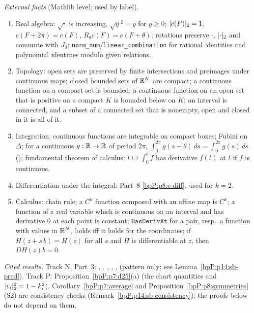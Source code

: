 \emph{External facts} (Mathlib level; used by label).
\begin{enumerate}[label=(X\arabic*),ref=(X\arabic*)]
\item\label{bpP:p14:sb-x-alg} Real algebra: $\sqrt{\cdot}$ is increasing, $\sqrt{y}^2=y$ for $y\ge0$; $\lvert c(F)\rvert_2=1$, $c(F+2\pi)=c(F)$, $R_\theta c(F)=c(F+\theta)$; rotations preserve $\cdot$, $\lvert \cdot\rvert_2$ and commute with $J_0$; \texttt{norm\_num}/\texttt{linear\_combination} for rational identities and polynomial identities modulo given relations.
\item\label{bpP:p14:sb-x-top} Topology: open sets are preserved by finite intersections and preimages under continuous maps; closed bounded sets of $\mathbb{R}^N$ are compact; a continuous function on a compact set is bounded; a continuous function on an open set that is positive on a compact $K$ is bounded below on $K$; an interval is connected, and a subset of a connected set that is nonempty, open and closed in it is all of it.
\item\label{bpP:p14:sb-x-int} Integration: continuous functions are integrable on compact boxes; Fubini on $\Delta$; for a continuous $g:\mathbb{R}\to\mathbb{R}$ of period $2\pi$, $\int_0^{2\pi}g(s-\theta)\,ds=\int_0^{2\pi}g(s)\,ds$ (); fundamental theorem of calculus: $t\mapsto\int_0^t f$ has derivative $f(t)$ at $t$ if $f$ is continuous.
\item\label{bpP:p14:sb-x-diff} Differentiation under the integral: Part~8 \ref{bpP:p8:e-diff}, used for $k=2$.
\item\label{bpP:p14:sb-x-calc} Calculus: chain rule; a $C^k$ function composed with an affine map is $C^k$; a function of a real variable which is continuous on an interval and has derivative $0$ at each point is constant; $\texttt{HasDerivAt}$ for a pair, resp.\ a function with values in $\mathbb{R}^N$, holds iff it holds for the coordinates; if $H(z+s\,b)=H(z)$ for all $s$ and $H$ is differentiable at $z$, then $DH(z)b=0$.
\end{enumerate}
\emph{Cited results.} Track N, Part~3: , , , , ,  (pattern only; see Lemma~\ref{bpP:p14:sb-pred}).
Track P: Proposition~\ref{bpP:p7:d25}(a) (the chart quantities and $\lvert v_i\rvert_2^2=1-k_i^2$), Corollary~\ref{bpP:p7:average} and Proposition~\ref{bpP:p8:symmetries}(S2) are consistency checks (Remark~\ref{bpP:p14:sb-consistency}); the proofs below do not depend on them.

